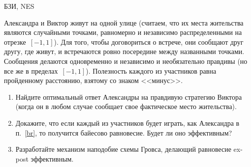 \begin{problem}
\begin{source}
БЗИ, NES
\end{source}
 Александра и Виктор живут на
одной улице (считаем, что их места жительства являются
случайными точками, равномерно и независимо распределенными
на отрезке~$[-1,1]$). Для того, чтобы договориться о
встрече, они сообщают друг другу, где живут, и встречаются
ровно посередине между названными точками. Сообщения
делаются одновременно и независимо и необязательно правдивы
(но все же в пределах~$[-1,1]$). Полезность каждого из
участников равна пройденному расстоянию, взятому со знаком
<<минус>>.
\begin{enumerate}
 \item\label{br} Найдите оптимальный ответ Александры на правдивую
стратегию Виктора (когда он в любом случае сообщает свое
фактическое место жительства).
 \item Докажите, что если каждый из участников будет играть, как Александра
в п.~\ref{br}, то получится байесово равновесие. Будет ли
оно эффективным?
 \item{\red [T]} Разработайте механизм наподобие схемы Гровса, делающий
равновесие ex-post эффективным.
\end{enumerate}






\begin{sol}

\end{sol}
\end{problem}





